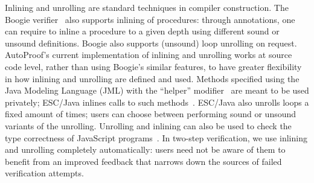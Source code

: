 Inlining and unrolling are standard techniques in compiler construction.
The Boogie verifier~\cite{LEINO08} also supports inlining of procedures: through annotations, one can require to inline a procedure to a given depth using different sound or unsound definitions. 
Boogie also supports (unsound) loop unrolling on request.
AutoProof's current implementation of inlining and unrolling works at source code level, rather than using Boogie's similar features, to have greater flexibility in how inlining and unrolling are defined and used.
Methods specified using the Java Modeling Language (JML) with the ``helper'' modifier~\cite{COK05} are meant to be used privately; ESC/Java inlines calls to such methods~\cite{FLANAGAN02}. 
ESC/Java also unrolls loops a fixed amount of times; users can choose between performing sound or unsound variants of the unrolling.
Unrolling and inlining can also be used to check the type correctness of JavaScript programs~\cite{NORDIO13}.
In two-step verification, we use inlining and unrolling completely automatically: users need not be aware of them to benefit from an improved feedback that narrows down the sources of failed verification attempts.

